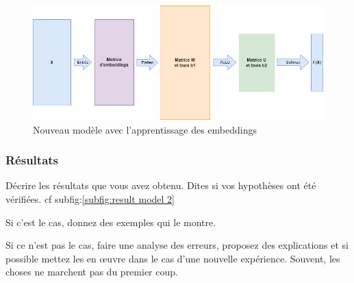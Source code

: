 \documentclass[a4paper]{article}
\begin{document}
\begin{figure}
    \centering
    \includegraphics[width=0.60\linewidth]{model2.png}
    \caption{Nouveau modèle avec l'apprentissage des embeddings}
    \label{fig:model2}
\end{figure}


\subsubsection{Résultats}

Décrire les résultats que vous avez obtenu. Dites si vos hypothèses ont été vérifiées. cf subfig:\ref{subfig:result model 2}

Si c'est le cas, donnez des exemples qui le montre.

Si ce n'est pas le cas, faire une analyse des erreurs, proposez des explications et si possible mettez les en \oe uvre dans le cas d'une nouvelle expérience. Souvent, les choses ne marchent pas du premier coup.
\end{document}
